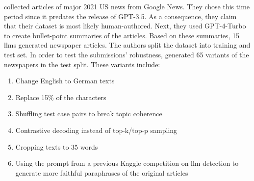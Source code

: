 \citet{ayele_overview_nodate} collected articles of major 2021 US news from Google News.
They chose this time period since it predates the release of GPT-3.5.
As a consequence, they claim that their dataset is most likely human-authored.
Next, they used GPT-4-Turbo to create bullet-point summaries of the articles. 
Based on these summaries, 15 \acp{llm} generated newspaper articles.
The authors split the dataset into training and test set.
In order to test the submissions' robustness, \citet{ayele_overview_nodate} generated 65 variants of the newspapers in the test split.
These variants include:
\begin{enumerate}
    \item Change English to German texts
    \item Replace 15\% of the characters
    \item Shuffling test case pairs to break topic coherence 
    \item Contrastive decoding instead of top-k/top-p sampling
    \item Cropping texts to 35 words
    \item Using the prompt from a previous Kaggle competition on \ac{llm} detection to generate more faithful paraphrases of the original articles
\end{enumerate}